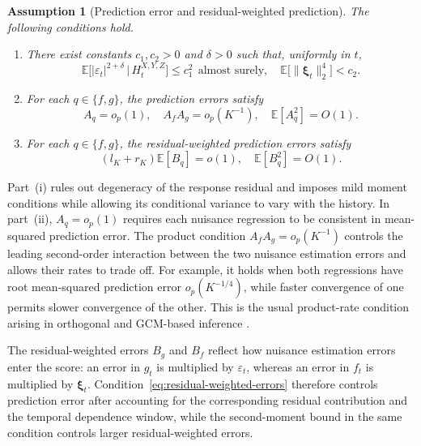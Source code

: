 \documentclass[12pt]{article}
\def\E{\mathbb{E}}
\newtheorem{assumption}[theorem]{Assumption}
\newcommand\given{\,|\,}
\numberwithin{equation}{section}
\begin{document}
\begin{assumption}[Prediction error and residual-weighted prediction]
\label{ass:errors}
The following conditions hold.
\begin{enumerate}
\item[(i)] There exist constants \(c_1,c_2>0\) and \(\delta>0\)
such that, uniformly in \(t\),
\[
\E\big[|\varepsilon_t|^{2+\delta}\given H_t^{X,Y,Z}\big]\le c_1^2~~\text{almost surely},
\quad
\E\big[\|\boldsymbol\xi_t\|_2^4\big]<c_2.
\]

\item[(ii)] For each \(q\in\{f,g\}\), the prediction errors satisfy
\begin{equation}
\label{eq:Kmsemse}
A_q=o_p(1),\quad
A_fA_g=o_p(K^{-1}),\quad
\E[A_q^2]=O(1).
\end{equation}

\item[(iii)] For each \(q\in\{f,g\}\), the residual-weighted prediction
errors satisfy
\begin{equation}
\label{eq:residual-weighted-errors}
(l_K+r_K)\E[B_q]=o(1), \quad \E[B_q^2]=O(1).
\end{equation}
\end{enumerate}
\end{assumption}

Part~(i) rules out degeneracy of the response residual and imposes mild
moment conditions while allowing its conditional variance to vary with the
history. In part~(ii), \(A_q=o_p(1)\) requires each nuisance regression to
be consistent in mean-squared prediction error. The product condition
\(A_fA_g=o_p(K^{-1})\) controls the leading second-order interaction between
the two nuisance estimation errors and allows their rates to trade off. For
example, it holds when both regressions have root mean-squared prediction
error \(o_p(K^{-1/4})\), while faster convergence of one permits slower
convergence of the other. This is the usual product-rate condition arising
in orthogonal and GCM-based inference \citep{shah2020hardness}.

The residual-weighted errors \(B_g\) and \(B_f\) reflect how nuisance estimation errors enter the score: an error in \(g_t\) is multiplied by \(\varepsilon_t\), whereas an error in \(f_t\) is multiplied by \(\boldsymbol\xi_t\). Condition~\eqref{eq:residual-weighted-errors} therefore controls prediction error after accounting for the corresponding residual contribution and the temporal dependence window, while the second-moment bound in the same condition controls larger residual-weighted
errors.
\end{document}
